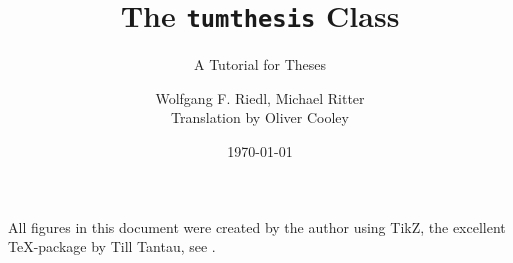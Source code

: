 \documentclass[]{tumthesis}
\author{Wolfgang F. Riedl, Michael Ritter\\Translation by Oliver Cooley}
\title{The \texttt{tumthesis} Class}
\subtitle{A Tutorial for Theses}
\institute{Department of Mathematics}
\date{\today} %
\begin{document}
\pagestyle{empty}
\frontmatter%
\maketitlepage%
\makedeclaration%


\tableofcontents%

\mainmatter%
\pagestyle{headings}





\appendix

\backmatter

\listoffigures

\vspace*{1.5cm}

All figures in this document were created by the author using TikZ, the excellent \TeX-package by Till Tantau, see \cite{Tantau2007}.



\listoftables





\printindex

\printbibliography[heading=bibintoc]

\listoffixmes
%
\end{document}
